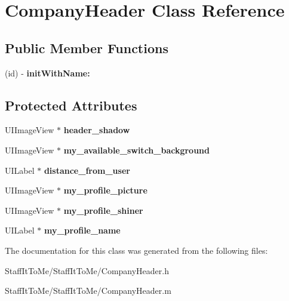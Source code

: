 \hypertarget{interface_company_header}{
\section{\-Company\-Header \-Class \-Reference}
\label{interface_company_header}
}
\subsection*{\-Public \-Member \-Functions}
\begin{DoxyCompactItemize}
\item 
\hypertarget{interface_company_header_a165a23988c92cf6798b0f81e9cb6e3a1}{
(id) -\/ {\bfseries init\-With\-Name\-:}}
\label{interface_company_header_a165a23988c92cf6798b0f81e9cb6e3a1}

\end{DoxyCompactItemize}
\subsection*{\-Protected \-Attributes}
\begin{DoxyCompactItemize}
\item 
\hypertarget{interface_company_header_a7d6ebe028b3e2746091efbc5c9917150}{
\-U\-I\-Image\-View $\ast$ {\bfseries header\-\_\-shadow}}
\label{interface_company_header_a7d6ebe028b3e2746091efbc5c9917150}

\item 
\hypertarget{interface_company_header_a8efa87ba843bee11b508c3a30ff365f5}{
\-U\-I\-Image\-View $\ast$ {\bfseries my\-\_\-available\-\_\-switch\-\_\-background}}
\label{interface_company_header_a8efa87ba843bee11b508c3a30ff365f5}

\item 
\hypertarget{interface_company_header_a33b655249d5073a85edc43c824c71843}{
\-U\-I\-Label $\ast$ {\bfseries distance\-\_\-from\-\_\-user}}
\label{interface_company_header_a33b655249d5073a85edc43c824c71843}

\item 
\hypertarget{interface_company_header_ab80a63a25381d6eda912832e7d54767f}{
\-U\-I\-Image\-View $\ast$ {\bfseries my\-\_\-profile\-\_\-picture}}
\label{interface_company_header_ab80a63a25381d6eda912832e7d54767f}

\item 
\hypertarget{interface_company_header_a0731c9125b2d17382f5646593d320b0f}{
\-U\-I\-Image\-View $\ast$ {\bfseries my\-\_\-profile\-\_\-shiner}}
\label{interface_company_header_a0731c9125b2d17382f5646593d320b0f}

\item 
\hypertarget{interface_company_header_aad5a4a79692be494df8da51c0dbb7ff9}{
\-U\-I\-Label $\ast$ {\bfseries my\-\_\-profile\-\_\-name}}
\label{interface_company_header_aad5a4a79692be494df8da51c0dbb7ff9}

\end{DoxyCompactItemize}


\-The documentation for this class was generated from the following files\-:\begin{DoxyCompactItemize}
\item 
\-Staff\-It\-To\-Me/\-Staff\-It\-To\-Me/\-Company\-Header.\-h\item 
\-Staff\-It\-To\-Me/\-Staff\-It\-To\-Me/\-Company\-Header.\-m\end{DoxyCompactItemize}
